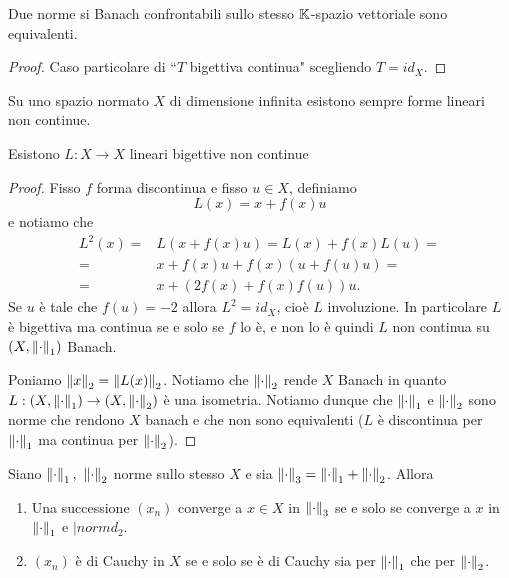 \begin{proposition}\label{PrNormeConfrontabiliSuBanachSonoEquivalenti}
Due norme si Banach confrontabili sullo stesso $\mathbb{K}$-spazio vettoriale sono equivalenti.
\end{proposition}
\begin{proof}
Caso particolare di ``$T$ bigettiva continua" scegliendo $T=id_X$.
\end{proof}

\begin{exercise}
Su uno spazio normato $X$ di dimensione infinita esistono sempre forme lineari non continue. 
\end{exercise}

\begin{remark}
Esistono $L:X\to X$ lineari bigettive non continue
\end{remark}
\begin{proof}
Fisso $f$ forma discontinua e fisso $u\in X$, definiamo
\[L(x)=x+f(x)u\]
e notiamo che
\begin{align*}
L^2(x)=&L(x+f(x)u)=L(x)+f(x)L(u)=\\
=&x+f(x)u +f(x)(u+f(u)u)=\\
=&x+(2f(x)+f(x)f(u))u.
\end{align*}
Se $u$ \`e tale che $f(u)=-2$ allora $L^2=id_X$, cio\`e $L$ involuzione. In particolare $L$ \`e bigettiva ma continua se e solo se $f$ lo \`e, e non lo \`e quindi $L$ non continua su $(X,\left\Vert{\cdot}\right\Vert_1)$ Banach.

Poniamo $\left\Vert{x}\right\Vert_2=\left\Vert{L(x)}\right\Vert_2$. Notiamo che $\left\Vert{\cdot}\right\Vert_2$ rende $X$ Banach in quanto $L:(X,\left\Vert{\cdot}\right\Vert_1)\to (X,\left\Vert{\cdot}\right\Vert_2)$ \`e una isometria. Notiamo dunque che $\left\Vert{\cdot}\right\Vert_1$ e $\left\Vert{\cdot}\right\Vert_2$ sono norme che rendono $X$ banach e che non sono equivalenti ($L$ \`e discontinua per $\left\Vert{\cdot}\right\Vert_1$ ma continua per $\left\Vert{\cdot}\right\Vert_2$).
\end{proof}

\begin{exercise}
Siano $\left\Vert{\cdot}\right\Vert_1,\ \left\Vert{\cdot}\right\Vert_2$ norme sullo stesso $X$ e sia $\left\Vert{\cdot}\right\Vert_3=\left\Vert{\cdot}\right\Vert_1+\left\Vert{\cdot}\right\Vert_2$. Allora
\begin{enumerate}
    \item Una successione $(x_n)$ converge a $x\in X$ in $\left\Vert{\cdot}\right\Vert_3$ se e solo se converge a $x$ in $\left\Vert{\cdot}\right\Vert_1$ e $|normd_2$.
    \item $(x_n)$ \`e di Cauchy in $X$ se e solo se \`e di Cauchy sia per $\left\Vert{\cdot}\right\Vert_1$ che per $\left\Vert{\cdot}\right\Vert_2$.
\end{enumerate}
\end{exercise}

